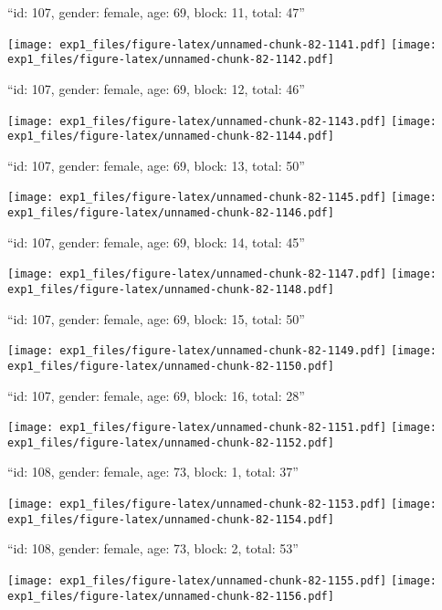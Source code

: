 \documentclass[11pt,,]{article}
\begin{document}
\newpage
[1] 

``id: 107, gender: female, age: 69, block: 11, total: 47''

\texttt{[image: exp1\_files/figure-latex/unnamed-chunk-82-1141.pdf]}
\texttt{[image: exp1\_files/figure-latex/unnamed-chunk-82-1142.pdf]}

\newpage
[1] 

``id: 107, gender: female, age: 69, block: 12, total: 46''

\texttt{[image: exp1\_files/figure-latex/unnamed-chunk-82-1143.pdf]}
\texttt{[image: exp1\_files/figure-latex/unnamed-chunk-82-1144.pdf]}

\newpage
[1] 

``id: 107, gender: female, age: 69, block: 13, total: 50''

\texttt{[image: exp1\_files/figure-latex/unnamed-chunk-82-1145.pdf]}
\texttt{[image: exp1\_files/figure-latex/unnamed-chunk-82-1146.pdf]}

\newpage
[1] 

``id: 107, gender: female, age: 69, block: 14, total: 45''

\texttt{[image: exp1\_files/figure-latex/unnamed-chunk-82-1147.pdf]}
\texttt{[image: exp1\_files/figure-latex/unnamed-chunk-82-1148.pdf]}

\newpage
[1] 

``id: 107, gender: female, age: 69, block: 15, total: 50''

\texttt{[image: exp1\_files/figure-latex/unnamed-chunk-82-1149.pdf]}
\texttt{[image: exp1\_files/figure-latex/unnamed-chunk-82-1150.pdf]}

\newpage
[1] 

``id: 107, gender: female, age: 69, block: 16, total: 28''

\texttt{[image: exp1\_files/figure-latex/unnamed-chunk-82-1151.pdf]}
\texttt{[image: exp1\_files/figure-latex/unnamed-chunk-82-1152.pdf]}

\newpage
[1] 

``id: 108, gender: female, age: 73, block: 1, total: 37''

\texttt{[image: exp1\_files/figure-latex/unnamed-chunk-82-1153.pdf]}
\texttt{[image: exp1\_files/figure-latex/unnamed-chunk-82-1154.pdf]}

\newpage
[1] 

``id: 108, gender: female, age: 73, block: 2, total: 53''

\texttt{[image: exp1\_files/figure-latex/unnamed-chunk-82-1155.pdf]}
\texttt{[image: exp1\_files/figure-latex/unnamed-chunk-82-1156.pdf]}
\end{document}
